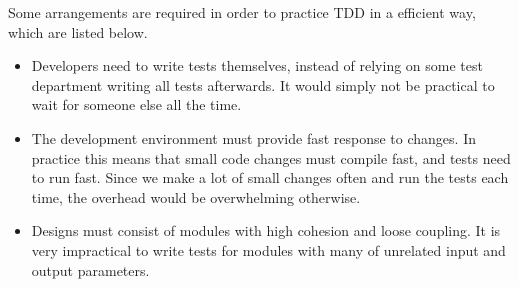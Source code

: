 Some arrangements are required in order to practice TDD in a efficient
way, which are listed below.

\begin{itemize}
    \item Developers need to write tests themselves, instead of relying
          on some test department writing all tests afterwards. It would
          simply not be practical to wait for someone else all the time.

    \item The development environment must provide fast response to changes.
          In practice this means that small code changes must compile fast,
          and tests need to run fast. Since we make a lot of small changes
          often and run the tests each time, the overhead would be overwhelming
          otherwise.

    \item Designs must consist of modules with high cohesion and loose coupling.
          It is very impractical to write tests for modules with many of
          unrelated input and output parameters.
\end{itemize}


